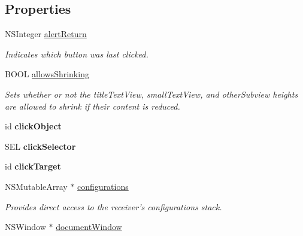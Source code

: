 \subsection*{Properties}
\begin{CompactItemize}
\item 
NSInteger \hyperlink{interface_s_s_y_alert_b3065737274d58b88c313f36a54316eb}{alertReturn}
\begin{CompactList}\small\item\em Indicates which button was last clicked. \item\end{CompactList}\item 
BOOL \hyperlink{interface_s_s_y_alert_67ba8d274d0cfa509a178ee291f60d6f}{allowsShrinking}
\begin{CompactList}\small\item\em Sets whether or not the titleTextView, smallTextView, and otherSubview heights are allowed to shrink if their content is reduced. \item\end{CompactList}\item 
\hypertarget{interface_s_s_y_alert_77b7399c0360bd1df68fb67fdceb8b9a}{
id \textbf{clickObject}}
\label{interface_s_s_y_alert_77b7399c0360bd1df68fb67fdceb8b9a}

\item 
\hypertarget{interface_s_s_y_alert_cb50f0a974f22ac67b867ac9ac1bbbc0}{
SEL \textbf{clickSelector}}
\label{interface_s_s_y_alert_cb50f0a974f22ac67b867ac9ac1bbbc0}

\item 
\hypertarget{interface_s_s_y_alert_29f41d63091fcdd18bf8bc68b34b2909}{
id \textbf{clickTarget}}
\label{interface_s_s_y_alert_29f41d63091fcdd18bf8bc68b34b2909}

\item 
NSMutableArray $\ast$ \hyperlink{interface_s_s_y_alert_e78e0ec0ccc4588e3fed7e25813b2e94}{configurations}
\begin{CompactList}\small\item\em Provides direct access to the receiver's configurations stack. \item\end{CompactList}\item 
\hypertarget{interface_s_s_y_alert_906b85403c881cf31ed94090f56da06c}{
NSWindow $\ast$ \hyperlink{interface_s_s_y_alert_906b85403c881cf31ed94090f56da06c}{documentWindow}}
\label{interface_s_s_y_alert_906b85403c881cf31ed94090f56da06c}


\end{CompactItemize}
